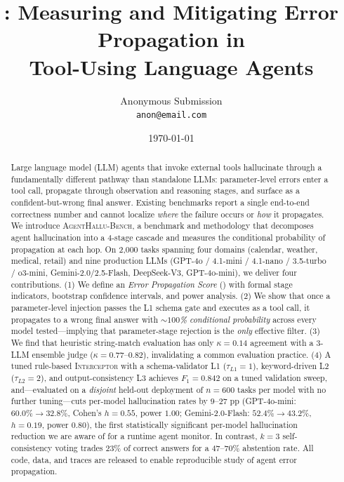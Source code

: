\documentclass[11pt]{article}
\title{\textbf{\halluben{}: Measuring and Mitigating Error Propagation in \\ Tool-Using Language Agents}}
\author{%
  Anonymous Submission \\
  \texttt{anon@email.com}
}
\date{\today}
\newcommand{\eps}{\mathrm{EPS}}
\newcommand{\interceptor}{\textsc{Interceptor}}
\newcommand{\halluben}{\textsc{AgentHallu-Bench}}
\begin{document}
\maketitle

\begin{abstract}
Large language model (LLM) agents that invoke external tools hallucinate through a fundamentally different pathway than standalone LLMs: parameter-level errors enter a tool call, propagate through observation and reasoning stages, and surface as a confident-but-wrong final answer. Existing benchmarks report a single end-to-end correctness number and cannot localize \emph{where} the failure occurs or \emph{how} it propagates. We introduce \halluben{}, a benchmark and methodology that decomposes agent hallucination into a 4-stage cascade and measures the conditional probability of propagation at each hop. On 2{,}000 tasks spanning four domains (calendar, weather, medical, retail) and nine production LLMs (GPT-4o / 4.1-mini / 4.1-nano / 3.5-turbo / o3-mini, Gemini-2.0/2.5-Flash, DeepSeek-V3, GPT-4o-mini), we deliver four contributions. (1) We define an \emph{Error Propagation Score} (\eps{}) with formal stage indicators, bootstrap confidence intervals, and power analysis. (2) We show that once a parameter-level injection passes the L1 schema gate and executes as a tool call, it propagates to a wrong final answer with \emph{$\sim\!100$\% conditional probability} across every model tested---implying that parameter-stage rejection is the \emph{only} effective filter. (3) We find that heuristic string-match evaluation has only $\kappa\!=\!0.14$ agreement with a 3-LLM ensemble judge ($\kappa\!=\!0.77\text{--}0.82$), invalidating a common evaluation practice. (4) A tuned rule-based \interceptor{} with a schema-validator L1 ($\tau_{L1}\!=\!1$), keyword-driven L2 ($\tau_{L2}\!=\!2$), and output-consistency L3 achieves $F_1\!=\!0.842$ on a tuned validation sweep, and---evaluated on a \emph{disjoint} held-out deployment of $n\!=\!600$ tasks per model with no further tuning---cuts per-model hallucination rates by $9$--$27$ pp (GPT-4o-mini: $60.0\%\!\to\!32.8\%$, Cohen's $h\!=\!0.55$, power $1.00$; Gemini-2.0-Flash: $52.4\%\!\to\!43.2\%$, $h\!=\!0.19$, power $0.80$), the first statistically significant per-model hallucination reduction we are aware of for a runtime agent monitor. In contrast, $k\!=\!3$ self-consistency voting trades 23\% of correct answers for a $47\text{--}70\%$ abstention rate. All code, data, and traces are released to enable reproducible study of agent error propagation.
\end{abstract}
\end{document}
